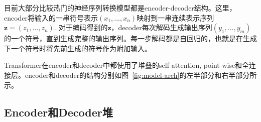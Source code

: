 
目前大部分比较热门的神经序列转换模型都是encoder-decoder结构\citep{cho2014learning,bahdanau2014neural,sutskever14}。这里，encoder将输入的一串符号表示$(x_1, ..., x_n)$映射到一串连续表示序列$\mathbf{z} = (z_1, ..., z_n)$. 对于编码得到的$\mathbf{z}$，decoder每次解码生成输出序列$(y_1,...,y_m)$的一个符号，直到生成完整的输出序列。每一步解码都是自回归的\citep{graves2013generating}，也就是在生成下一个符号时将先前生成的符号作为附加输入。


Transformer在encoder和decoder中都使用了堆叠的self-attention, point-wise和全连接层。encoder和decoder的结构分别如图~\ref{fig:model-arch}的左半部分和右半部分所示。

\subsection{Encoder和Decoder堆}


